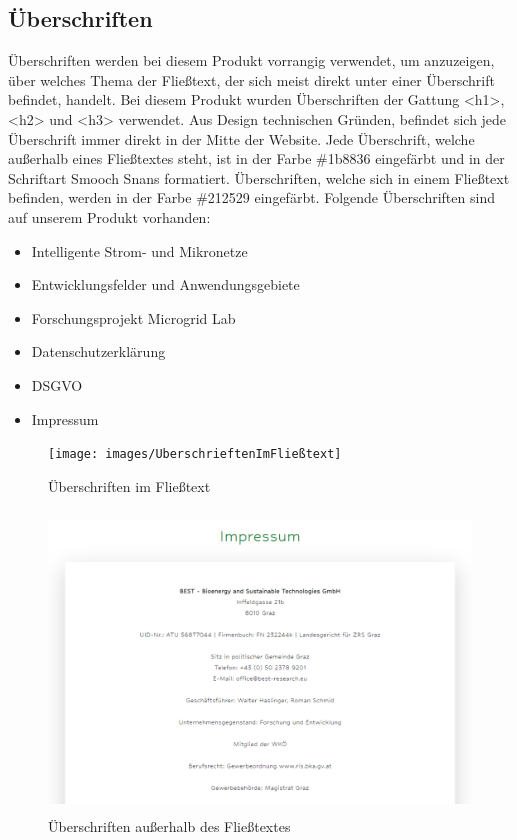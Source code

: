 \subsection{Überschriften}
Überschriften werden bei diesem Produkt vorrangig verwendet, um anzuzeigen, über welches Thema der Fließtext, der sich meist direkt unter einer Überschrift befindet, handelt. Bei diesem Produkt wurden Überschriften der Gattung <h1>, <h2> und <h3> verwendet. Aus Design technischen Gründen, befindet sich jede Überschrift immer direkt in der Mitte der Website. Jede Überschrift, welche außerhalb eines Fließtextes steht, ist in der Farbe \#1b8836 eingefärbt und in der Schriftart Smooch Snans formatiert. Überschriften, welche sich in einem Fließtext befinden, werden in der Farbe \#212529 eingefärbt. Folgende Überschriften sind auf unserem Produkt vorhanden: 
\begin{itemize}
	\item Intelligente Strom- und Mikronetze
	\item Entwicklungsfelder und Anwendungsgebiete
	\item Forschungsprojekt Microgrid Lab
	\item Datenschutzerklärung
	\item DSGVO
	\item Impressum
\end{itemize}
\newpage
\begin{figure}[h]
	\centering
	\texttt{[image: images/UberschrieftenImFließtext]}
	\caption{Überschriften im Fließtext}
	\label{fig: Überschriften im Fließtext}
\end{figure}
\begin{figure}[h]
	\centering
	\includegraphics[height=8cm,width=14cm]{images/ImpressumUberschrift}
	\caption{Überschriften außerhalb des Fließtextes}
	\label{fig: Überschriften außerhalb des Fließtextes}
\end{figure}
\newpage

